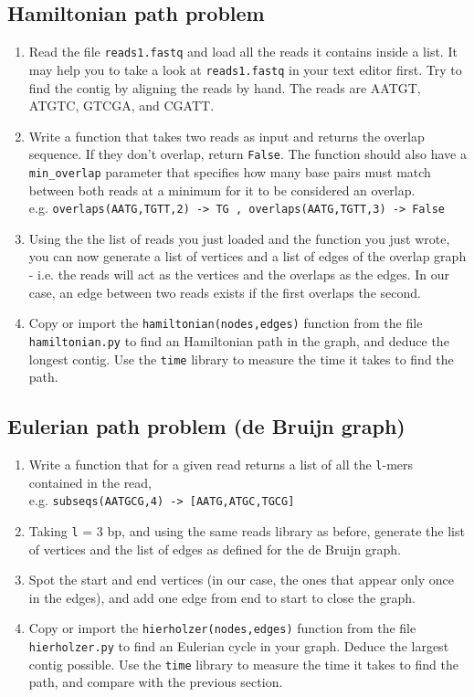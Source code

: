 \documentclass[a4paper,11pt]{article}
\begin{document}
\subsection{Hamiltonian path problem}
\begin{enumerate}
\item Read the file \texttt{reads1.fastq} and load all the reads it contains inside a list. It may help you to take a look at \texttt{reads1.fastq} in your text editor first. Try to find the contig by aligning the reads by hand. The reads are AATGT, ATGTC, GTCGA, and CGATT.
\item Write a function that takes two reads as input and returns the overlap sequence. If they don't overlap, return \texttt{False}. The function should also have a \texttt{min\_overlap} parameter that specifies how many base pairs must match between both reads at a minimum for it to be considered an overlap. \\
e.g. \texttt{overlaps(AATG,TGTT,2) -> TG , overlaps(AATG,TGTT,3) -> False}
\item Using the the list of reads you just loaded and the function you just wrote, you can now generate a list of vertices and a list of edges of the overlap graph - i.e. the reads will act as the vertices and the overlaps as the edges. In our case, an edge between two reads exists if the first overlaps the second.
\item Copy or import the \texttt{hamiltonian(nodes,edges)} function from the file \texttt{hamiltonian.py} to find an Hamiltonian path in the graph, and deduce the longest contig. Use the \texttt{time} library to measure the time it takes to find the path.
\end{enumerate}

\subsection{Eulerian path problem (de Bruijn graph)}
\begin{enumerate}
\item Write a function that for a given read returns a list of all the \texttt{l}-mers contained in the read, \\
e.g. \texttt{subseqs(AATGCG,4) ->  [AATG,ATGC,TGCG]}
\item Taking \texttt{l} = 3 bp, and using the same reads library as before, generate the list of vertices and the list of edges as defined for the de Bruijn graph.
\item Spot the start and end vertices (in our case, the ones that appear only once in the edges), and add one edge from end to start to close the graph.
\item Copy or import the \texttt{hierholzer(nodes,edges)} function from the file \texttt{hierholzer.py} to find an Eulerian cycle in your graph. Deduce the largest contig possible. Use the \texttt{time} library to measure the time it takes to find the path, and compare with the previous section.
\end{enumerate}
\end{document}
